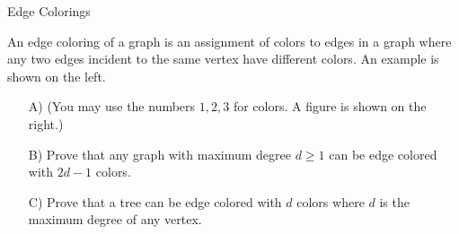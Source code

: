 \begin{homeworkProblem}{Edge Colorings}

    An edge coloring of a graph is an assignment of colors to edges in a graph where any two edges incident to the same vertex have different colors. An example is shown on the left.

    \begin{center}
    \end{center}

    \begin{itemize}
        \item[A)] (You may use the numbers $1,2,3$ for colors. A figure is shown on the right.)
        \item[B)] Prove that any graph with maximum degree $d \geq 1$ can be edge colored with $2d-1$ colors. 
        \item[C)] Prove that a tree can be edge colored with $d$ colors where $d$ is the maximum degree of any vertex.
    \end{itemize}
    
\end{homeworkProblem}